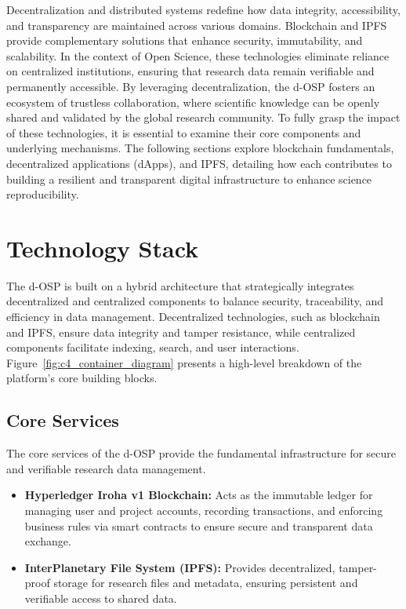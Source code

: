 \documentclass[final]{rc-book-2.14}
\begin{document}
Decentralization and distributed systems redefine how data integrity, accessibility, and transparency are maintained across various domains. Blockchain and IPFS provide complementary solutions that enhance security, immutability, and scalability. In the context of Open Science, these technologies eliminate reliance on centralized institutions, ensuring that research data remain verifiable and permanently accessible. By leveraging decentralization, the d-OSP fosters an ecosystem of trustless collaboration, where scientific knowledge can be openly shared and validated by the global research community. To fully grasp the impact of these technologies, it is essential to examine their core components and underlying mechanisms. The following sections explore blockchain fundamentals, decentralized applications (dApps), and IPFS, detailing how each contributes to building a resilient and transparent digital infrastructure to enhance science reproducibility.

\section{Technology Stack}
\label{chp:proposed_model:sec:tech_stack}

The d-OSP is built on a hybrid architecture that strategically integrates decentralized and centralized components to balance security, traceability, and efficiency in data management. Decentralized technologies, such as blockchain and IPFS, ensure data integrity and tamper resistance, while centralized components facilitate indexing, search, and user interactions. Figure~\ref{fig:c4_container_diagram} presents a high-level breakdown of the platform's core building blocks.

\subsection{Core Services}

The core services of the d-OSP provide the fundamental infrastructure for secure and verifiable research data management.

\begin{itemize}
    \item \textbf{Hyperledger Iroha v1 Blockchain:} Acts as the immutable ledger for managing user and project accounts, recording transactions, and enforcing business rules via smart contracts to ensure secure and transparent data exchange.
    \item \textbf{InterPlanetary File System (IPFS):} Provides decentralized, tamper-proof storage for research files and metadata, ensuring persistent and verifiable access to shared data.
\end{itemize}
\end{document}
